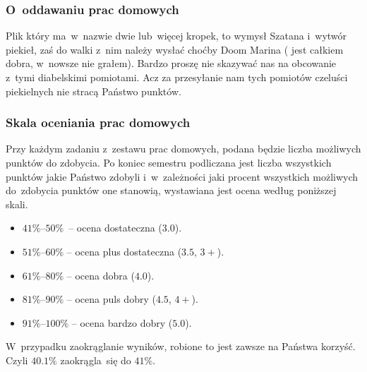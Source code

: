 \documentclass[10pt,t]{beamer}
\begin{document}
\begin{frame}
  \frametitle{O~oddawaniu prac domowych}


  Plik który ma~w~nazwie dwie lub~więcej kropek, to wymysł Szatana i~wytwór
  piekieł, zaś do walki z~nim należy wysłać choćby Doom Marina
  ( jest całkiem dobra, w~nowsze nie grałem). Bardzo proszę
  nie skazywać nas na obcowanie z~tymi diabelskimi pomiotami. Acz za
  przesyłanie nam tych pomiotów czeluści piekielnych nie stracą Państwo
  punktów.

\end{frame}





\begin{frame}
  \frametitle{Skala oceniania prac domowych}


  Przy każdym zadaniu z~zestawu prac domowych, podana będzie liczba
  możliwych punktów do zdobycia. Po koniec semestru podliczana jest liczba
  wszystkich punktów jakie Państwo zdobyli i~w~zależności jaki procent
  wszystkich możliwych do~zdobycia punktów one stanowią, wystawiana jest
  ocena według poniższej skali.

  \vspace{-0.3em}



  \begin{itemize}

  \item $41\%\text{--}50\%$~-- ocena dostateczna ($3.0$).

  \item $51\%\text{--}60\%$ -- ocena plus dostateczna ($3.5$, $3+$).

  \item $61\%\text{--}80\%$ -- ocena dobra ($4.0$).

  \item $81\%\text{--}90\%$ -- ocena puls dobry ($4.5$, $4+$).

  \item $91\%\text{--}100\%$ -- ocena bardzo dobry ($5.0$).

  \end{itemize}

  \vspace{-0.3em}



  W~przypadku zaokrąglanie wyników, robione to jest zawsze na Państwa
  korzyść. Czyli $40.1\%$ zaokrągla~się do $41\%$.

\end{frame}
\end{document}
